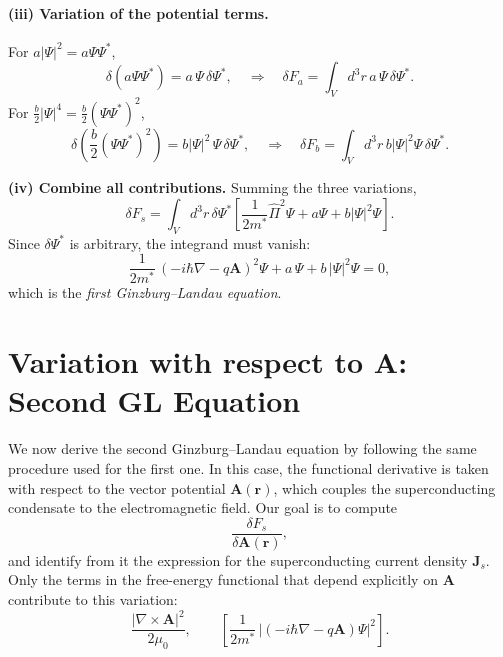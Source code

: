 \paragraph{(iii) Variation of the potential terms.}
For $a|\Psi|^2 = a\Psi\Psi^*$,
\[
\delta (a\Psi\Psi^*) = a\,\Psi\,\delta\Psi^*,
\quad \Rightarrow \quad
\delta F_a = \int_V d^3r\, a\,\Psi\,\delta\Psi^*.
\]
For $\frac{b}{2}|\Psi|^4 = \frac{b}{2}(\Psi\Psi^*)^2$,
\[
\delta\!\left(\frac{b}{2}(\Psi\Psi^*)^2\right)
= b|\Psi|^2\,\Psi\,\delta\Psi^*,
\quad \Rightarrow \quad
\delta F_b = \int_V d^3r\, b|\Psi|^2\Psi\,\delta\Psi^*.
\]

\bigskip
\noindent\textbf{(iv) Combine all contributions.}
Summing the three variations,
\[
\delta F_s
= \int_V d^3r\, \delta\Psi^*
\left[
\frac{1}{2m^*}\hat\Pi^2\Psi + a\Psi + b|\Psi|^2\Psi
\right].
\]
Since $\delta\Psi^*$ is arbitrary, the integrand must vanish:
\begin{equation}
\boxed{
\frac{1}{2m^*}\,(-i\hbar\nabla - q\mathbf A)^2 \Psi
+ a\,\Psi + b\,|\Psi|^2\Psi = 0,
}
\label{eq:GL1_final}
\end{equation}
which is the \emph{first Ginzburg--Landau equation}.

\section*{Variation with respect to $\mathbf A$: Second GL Equation}
\label{app:2_GL-derivation}

We now derive the second Ginzburg--Landau equation by following the same procedure used for the first one.  
In this case, the functional derivative is taken with respect to the vector potential $\mathbf{A}(\mathbf{r})$, which couples the superconducting condensate to the electromagnetic field.  
Our goal is to compute
\[
\frac{\delta F_s}{\delta \mathbf{A}(\mathbf{r})},
\]
and identify from it the expression for the superconducting current density $\mathbf{J}_s$.  
Only the terms in the free-energy functional that depend explicitly on $\mathbf{A}$ contribute to this variation:
\[
    \frac{|\nabla\times \mathbf A|^2}{2\mu_0}, 
    \qquad 
    \left[
    \frac{1}{2m^*}\, \big|(-i\hbar\nabla - q \mathbf A)\Psi\big|^2
    \right].
\]


